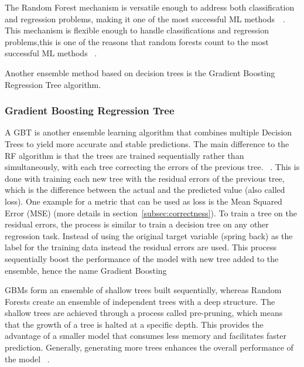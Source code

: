 The Random Forest mechanism is versatile enough to address both classification and regression problems, making it one
of the most successful
\ac{ML} methods~\cite[pp. 3--4]{biau2016random}~\cite[p. 25]{breiman2001random}.
This mechanism is flexible enough to handle classifications and regression problems,this is one of the reasons that
random forests count to the most successful \ac{ML}
methods
~\cite[pp. 1--4]{biau2016random}.

Another ensemble method based on decision trees is the Gradient Boosting Regression Tree algorithm.

\subsubsection{Gradient Boosting Regression Tree}

A \ac{GBT} is another ensemble learning algorithm that combines multiple Decision Trees
to yield more accurate and stable predictions.
The main difference to the \ac{RF} algorithm is that the trees are trained sequentially
rather than simultaneously, with each tree correcting the errors of the previous tree.
~\cite[pp. 88--89]{muller2016introduction}.
This is done with training each new tree with the residual errors of the previous tree, which is the
difference between the actual and the predicted value (also called loss).
One example for a metric that can be used as loss is the Mean Squared Error (MSE) (more details in
section~\ref{subsec:correctness}).
To train a tree on the residual errors, the process is similar to train a decision tree on any other regression
task.
Instead of using the original target variable (spring back) as the label for the training data instead the
residual errors are used.
This process sequentially boost the performance of the model with new tree added to the
ensemble, hence the name Gradient Boosting
~\cite[p. 222]{boehmke2019hands}

GBMs form an ensemble of shallow trees built sequentially, whereas Random Forests create an ensemble of independent trees with a deep structure.
The shallow trees are achieved through a process called pre-pruning, which means that the growth of a tree is halted
at a specific depth.
This provides the advantage of a smaller model that consumes less memory and facilitates faster prediction.
Generally, generating more trees enhances the overall performance of the
model
~\cite[pp. 74, 88--89]{muller2016introduction}.

